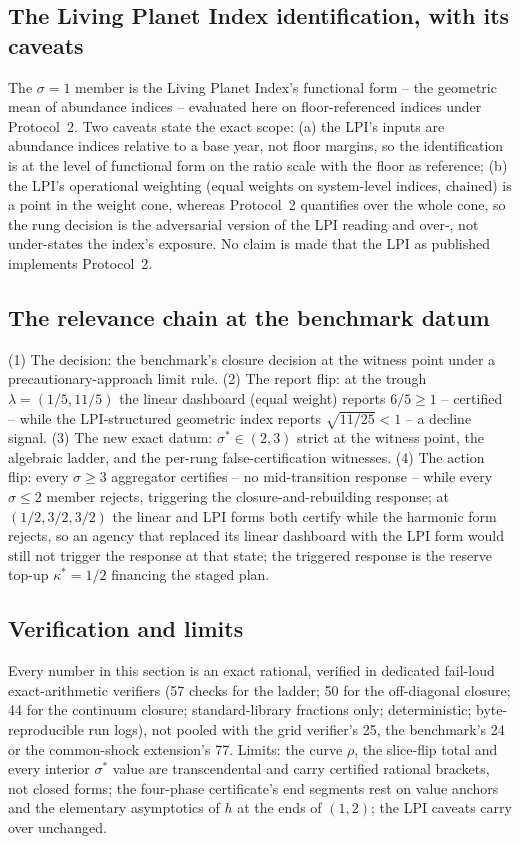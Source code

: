 \subsection{The Living Planet Index identification, with its caveats}

The $\sigma=1$ member is the Living Planet Index's functional form -- the geometric mean of abundance indices -- evaluated here on floor-referenced indices under Protocol~2. Two caveats state the exact scope: (a) the LPI's inputs are abundance indices relative to a base year, not floor margins, so the identification is at the level of functional form on the ratio scale with the floor as reference; (b) the LPI's operational weighting (equal weights on system-level indices, chained) is a point in the weight cone, whereas Protocol~2 quantifies over the whole cone, so the rung decision is the adversarial version of the LPI reading and over-, not under-states the index's exposure. No claim is made that the LPI as published implements Protocol~2.

\subsection{The relevance chain at the benchmark datum}

(1) The decision: the benchmark's closure decision at the witness point under a precautionary-approach limit rule. (2) The report flip: at the trough $\lambda=(1/5,11/5)$ the linear dashboard (equal weight) reports $6/5\ge1$ -- certified -- while the LPI-structured geometric index reports $\sqrt{11/25}<1$ -- a decline signal. (3) The new exact datum: $\sigma^*\in(2,3)$ strict at the witness point, the algebraic ladder, and the per-rung false-certification witnesses. (4) The action flip: every $\sigma\ge3$ aggregator certifies -- no mid-transition response -- while every $\sigma\le2$ member rejects, triggering the closure-and-rebuilding response; at $(1/2,3/2,3/2)$ the linear and LPI forms both certify while the harmonic form rejects, so an agency that replaced its linear dashboard with the LPI form would still not trigger the response at that state; the triggered response is the reserve top-up $\kappa^*=1/2$ financing the staged plan.

\subsection{Verification and limits}

Every number in this section is an exact rational, verified in dedicated fail-loud exact-arithmetic verifiers (57 checks for the ladder; 50 for the off-diagonal closure; 44 for the continuum closure; standard-library fractions only; deterministic; byte-reproducible run logs), not pooled with the grid verifier's 25, the benchmark's 24 or the common-shock extension's 77. Limits: the curve $\rho$, the slice-flip total and every interior $\sigma^*$ value are transcendental and carry certified rational brackets, not closed forms; the four-phase certificate's end segments rest on value anchors and the elementary asymptotics of $h$ at the ends of $(1,2)$; the LPI caveats carry over unchanged.

